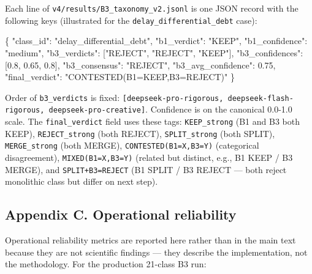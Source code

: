\documentclass[
  letterpaper,
  11pt]{article}
\newenvironment{Shaded}{}{}
\newcommand{\DataTypeTok}[1]{\textcolor[rgb]{0.56,0.13,0.00}{#1}}
\newcommand{\FloatTok}[1]{\textcolor[rgb]{0.25,0.63,0.44}{#1}}
\newcommand{\FunctionTok}[1]{\textcolor[rgb]{0.02,0.16,0.49}{#1}}
\newcommand{\OtherTok}[1]{\textcolor[rgb]{0.00,0.44,0.13}{#1}}
\newcommand{\StringTok}[1]{\textcolor[rgb]{0.25,0.44,0.63}{#1}}
\begin{document}
Each line of \texttt{v4/results/B3\_taxonomy\_v2.jsonl} is one JSON
record with the following keys (illustrated for the
\texttt{delay\_differential\_debt} case):

\begin{Shaded}
\begin{Highlighting}[]
\FunctionTok{\{}
  \DataTypeTok{"class\_id"}\FunctionTok{:} \StringTok{"delay\_differential\_debt"}\FunctionTok{,}
  \DataTypeTok{"b1\_verdict"}\FunctionTok{:} \StringTok{"KEEP"}\FunctionTok{,}
  \DataTypeTok{"b1\_confidence"}\FunctionTok{:} \StringTok{"medium"}\FunctionTok{,}
  \DataTypeTok{"b3\_verdicts"}\FunctionTok{:} \OtherTok{[}\StringTok{"REJECT"}\OtherTok{,} \StringTok{"REJECT"}\OtherTok{,} \StringTok{"KEEP"}\OtherTok{]}\FunctionTok{,}
  \DataTypeTok{"b3\_confidences"}\FunctionTok{:} \OtherTok{[}\FloatTok{0.8}\OtherTok{,} \FloatTok{0.65}\OtherTok{,} \FloatTok{0.8}\OtherTok{]}\FunctionTok{,}
  \DataTypeTok{"b3\_consensus"}\FunctionTok{:} \StringTok{"REJECT"}\FunctionTok{,}
  \DataTypeTok{"b3\_avg\_confidence"}\FunctionTok{:} \FloatTok{0.75}\FunctionTok{,}
  \DataTypeTok{"final\_verdict"}\FunctionTok{:} \StringTok{"CONTESTED(B1=KEEP,B3=REJECT)"}
\FunctionTok{\}}
\end{Highlighting}
\end{Shaded}

Order of \texttt{b3\_verdicts} is fixed:
\texttt{{[}deepseek-pro-rigorous,\ deepseek-flash-rigorous,\ deepseek-pro-creative{]}}.
Confidence is on the canonical 0.0-1.0 scale. The
\texttt{final\_verdict} field uses these tags: \texttt{KEEP\_strong} (B1
and B3 both KEEP), \texttt{REJECT\_strong} (both REJECT),
\texttt{SPLIT\_strong} (both SPLIT), \texttt{MERGE\_strong} (both
MERGE), \texttt{CONTESTED(B1=X,B3=Y)} (categorical disagreement),
\texttt{MIXED(B1=X,B3=Y)} (related but distinct, e.g., B1 KEEP / B3
MERGE), and \texttt{SPLIT+B3=REJECT} (B1 SPLIT / B3 REJECT --- both
reject monolithic class but differ on next step).

\subsection{Appendix C. Operational
reliability}\label{appendix-c.-operational-reliability}

Operational reliability metrics are reported here rather than in the
main text because they are not scientific findings --- they describe the
implementation, not the methodology. For the production 21-class B3 run:
\end{document}
